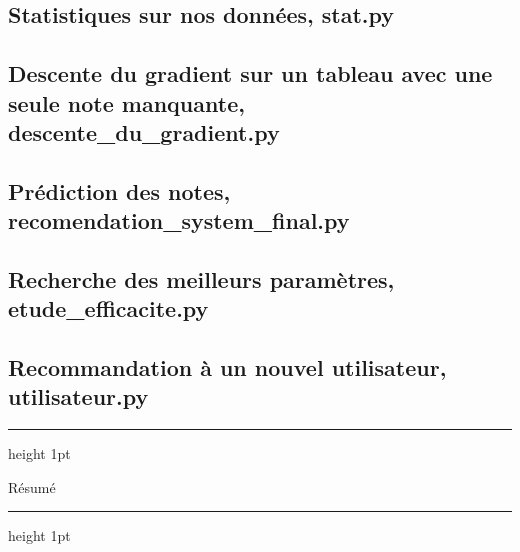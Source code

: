\documentclass[a4paper,10pt]{article}
\newenvironment{changemargin}[2]{\begin{list}{}{%
\setlength{\topsep}{0pt}%
\setlength{\leftmargin}{0pt}%
\setlength{\rightmargin}{0pt}%
\setlength{\listparindent}{\parindent}%
\setlength{\itemindent}{\parindent}%
\setlength{\parsep}{0pt plus 1pt}%
\addtolength{\leftmargin}{#1}%
\addtolength{\rightmargin}{#2}%
}\item }{\end{list}}
\begin{document}
\subsection{Statistiques sur nos données, stat.py} 
\label{stat}

\begin{changemargin}{-4cm}{0cm} 
 
\end{changemargin} 
 
\subsection{Descente du gradient sur un tableau avec une seule note manquante, descente\_du\_gradient.py} 
\begin{changemargin}{-4cm}{0cm} 
 
\end{changemargin} 
 
\subsection{Prédiction des notes, recomendation\_system\_final.py} 
\begin{changemargin}{-4cm}{0cm} 
 
\end{changemargin} 
 
\subsection{Recherche des meilleurs paramètres, etude\_efficacite.py} 
\begin{changemargin}{-4cm}{0cm} 
 
\end{changemargin}

\subsection{Recommandation à un nouvel utilisateur, utilisateur.py} 
\begin{changemargin}{-4cm}{0cm} 
 
\end{changemargin}


\newpage

\hrule height 1pt
\begin{center}
\begin{Large}Résumé\end{Large}
\end{center}
\hrule height 1pt
\vskip 1cm
\end{document}
